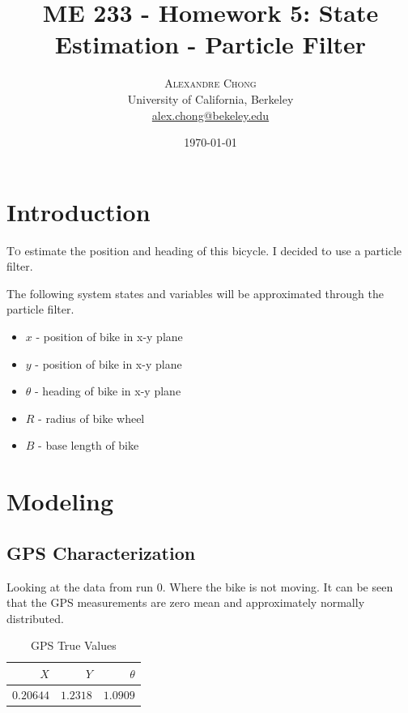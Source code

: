\documentclass[twoside,twocolumn]{article}
\title{ME 233 - Homework 5: State Estimation - Particle Filter} %
\author{%
\textsc{Alexandre Chong} \\[1ex] %
\normalsize University of California, Berkeley \\ %
\normalsize \href{mailto:alex.chong@berkeley.edu}{alex.chong@bekeley.edu} %
}
\date{\today} %
\begin{document}
\maketitle


\section{Introduction}

\lettrine[nindent=0em,lines=3]{T}o estimate the position and heading of this bicycle. I decided to use a particle filter.

The following system states and variables will be approximated through the particle filter.
\begin{itemize}
\item $x$ - position of bike in x-y plane
\item $y$ - position of bike in x-y plane
\item $\theta$ - heading of bike in x-y plane
\item $R$ - radius of bike wheel
\item $B$ - base length of bike
\end{itemize}
\section{Modeling}

\subsection{GPS Characterization}
Looking at the data from run 0. Where the bike is not moving. It can be seen that the GPS measurements are zero mean and approximately normally distributed.

\begin{table}[h!]
\centering
\caption{GPS True Values}
\label{table:alg1}
\begin{tabular}{rrr}
\hline
$X$ & $Y$ & $\theta$ \\ [0.5ex] 
\hline
$0.20644$ & $1.2318$ & $1.0909$\\
\hline
\end{tabular}
\end{table}
\end{document}
